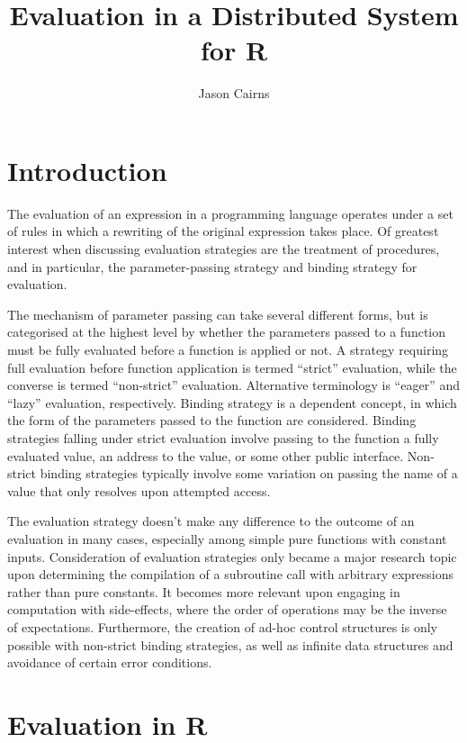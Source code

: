 \documentclass[10pt,a4paper]{article}
\begin{document}
    \title{Evaluation in a Distributed System for R}
    \author{Jason Cairns}
      
    \maketitle

\section{Introduction}

The evaluation of an expression in a programming language operates under a set of rules in which a rewriting of the original expression takes place.
Of greatest interest when discussing evaluation strategies are the treatment of procedures, and in particular, the parameter-passing strategy and binding strategy for evaluation.

The mechanism of parameter passing can take several different forms, but is categorised at the highest level by whether the parameters passed to a function must be fully evaluated before a function is applied or not.
A strategy requiring full evaluation before function application is termed ``strict'' evaluation, while the converse is termed ``non-strict'' evaluation.
Alternative terminology is ``eager'' and ``lazy'' evaluation, respectively.
Binding strategy is a dependent concept, in which the form of the parameters passed to the function are considered.
Binding strategies falling under strict evaluation involve passing to the function a fully evaluated value, an address to the value, or some other public interface.
Non-strict binding strategies typically involve some variation on passing the name of a value that only resolves upon attempted access.

The evaluation strategy doesn't make any difference to the outcome of an evaluation in many cases, especially among simple pure functions with constant inputs.
Consideration of evaluation strategies only became a major research topic upon determining the compilation of a subroutine call with arbitrary expressions rather than pure constants.
It becomes more relevant upon engaging in computation with side-effects, where the order of operations may be the inverse of expectations.
Furthermore, the creation of ad-hoc control structures is only possible with non-strict binding strategies, as well as infinite data structures and avoidance of certain error conditions.

\section{Evaluation in R}\label{sec:evalinr}
\end{document}
